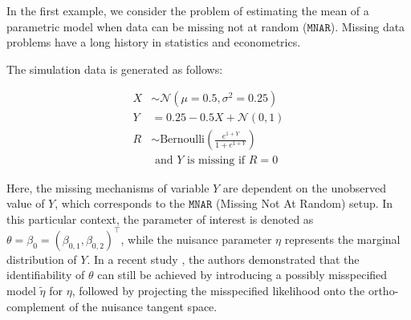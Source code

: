 \documentclass[11pt]{article}
\def\MNAR{\texttt{MNAR}}
\def\calN{\mathcal{N}}
\begin{document}
\begin{example}
\label{mnar_data}
In the first example, we consider the problem of estimating the mean of a parametric model when data can be missing not at random ($\MNAR$). Missing data problems have a long history in statistics and econometrics.

The simulation data is generated as follows:

\begin{equation}
\label{model-mnar}
\begin{split}
X & \sim \calN (\mu = 0.5, \sigma^{2} = 0.25) \\
Y & = 0.25 - 0.5 X + \calN (0, 1) \\
R & \sim \text{Bernoulli} \left( \frac{e^{1 + Y}}{1 + e^{1 + Y}} \right) \\
& \text{ and $Y$ is missing if $R = 0$}
\end{split}
\end{equation}

Here, the missing mechanisms of variable $Y$ are dependent on the unobserved value of $Y$, which corresponds to the $\MNAR$ (Missing Not At Random) setup. In this particular context, the parameter of interest is denoted as $\theta = \beta_{0} = (\beta_{0, 1}, \beta_{0, 2})^{\top}$, while the nuisance parameter $\eta$ represents the marginal distribution of $Y$. In a recent study \citep{zhao2021versatile}, the authors demonstrated that the identifiability of $\theta$ can still be achieved by introducing a possibly misspecified model $\tilde{\eta}$ for $\eta$, followed by projecting the misspecified likelihood onto the ortho-complement of the nuisance tangent space.
\label{eg:mnar}
\end{example}
\end{document}
